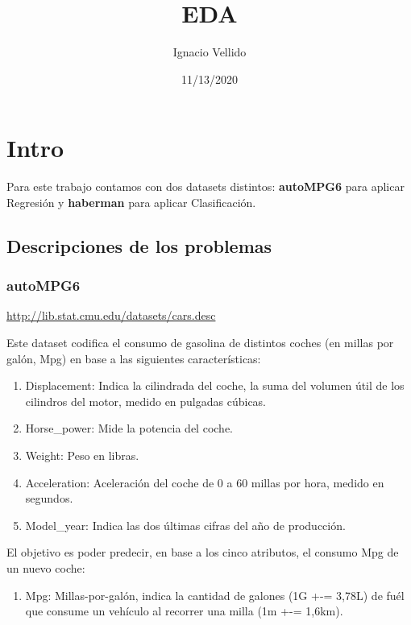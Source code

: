 \documentclass[
]{article}
\title{EDA}
\author{Ignacio Vellido}
\date{11/13/2020}
\providecommand{\tightlist}{%
  \setlength{\itemsep}{0pt}\setlength{\parskip}{0pt}}
\begin{document}
\maketitle

\hypertarget{intro}{%
\section{Intro}\label{intro}}

Para este trabajo contamos con dos datasets distintos: \textbf{autoMPG6}
para aplicar Regresión y \textbf{haberman} para aplicar Clasificación.

\hypertarget{descripciones-de-los-problemas}{%
\subsection{Descripciones de los
problemas}\label{descripciones-de-los-problemas}}

\hypertarget{autompg6}{%
\subsubsection{autoMPG6}\label{autompg6}}

\url{http://lib.stat.cmu.edu/datasets/cars.desc}

Este dataset codifica el consumo de gasolina de distintos coches (en
millas por galón, Mpg) en base a las siguientes características:

\begin{enumerate}
\def\labelenumi{\arabic{enumi}.}
\tightlist
\item
  Displacement: Indica la cilindrada del coche, la suma del volumen útil
  de los cilindros del motor, medido en pulgadas cúbicas.
\item
  Horse\_power: Mide la potencia del coche.
\item
  Weight: Peso en libras.
\item
  Acceleration: Aceleración del coche de 0 a 60 millas por hora, medido
  en segundos.
\item
  Model\_year: Indica las dos últimas cifras del año de producción.
\end{enumerate}

El objetivo es poder predecir, en base a los cinco atributos, el consumo
Mpg de un nuevo coche:

\begin{enumerate}
\def\labelenumi{\arabic{enumi}.}
\setcounter{enumi}{5}
\tightlist
\item
  Mpg: Millas-por-galón, indica la cantidad de galones (1G +-= 3,78L) de
  fuél que consume un vehículo al recorrer una milla (1m +-= 1,6km).
\end{enumerate}
\end{document}
